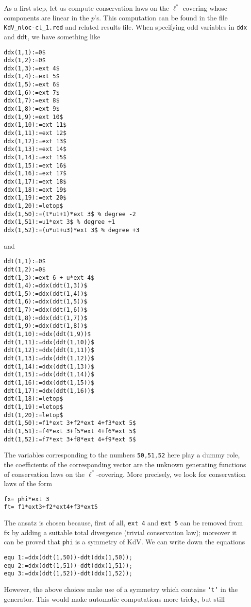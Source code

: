 \documentclass[12pt]{amsart}
\theoremstyle{definition}
\begin{document}
As a first step, let us compute conservation laws on the $\ell^*$-covering
whose components are linear in the $p$'s.  This computation can be found in the
file \texttt{KdV\_nloc-cl\_1.red} and related results file. When specifying odd
variables in \texttt{ddx} and \texttt{ddt}, we have something like
\begin{verbatim}
ddx(1,1):=0$
ddx(1,2):=0$
ddx(1,3):=ext 4$
ddx(1,4):=ext 5$
ddx(1,5):=ext 6$
ddx(1,6):=ext 7$
ddx(1,7):=ext 8$
ddx(1,8):=ext 9$
ddx(1,9):=ext 10$
ddx(1,10):=ext 11$
ddx(1,11):=ext 12$
ddx(1,12):=ext 13$
ddx(1,13):=ext 14$
ddx(1,14):=ext 15$
ddx(1,15):=ext 16$
ddx(1,16):=ext 17$
ddx(1,17):=ext 18$
ddx(1,18):=ext 19$
ddx(1,19):=ext 20$
ddx(1,20):=letop$
ddx(1,50):=(t*u1+1)*ext 3$ % degree -2
ddx(1,51):=u1*ext 3$ % degree +1
ddx(1,52):=(u*u1+u3)*ext 3$ % degree +3
\end{verbatim}
and
\begin{verbatim}
ddt(1,1):=0$
ddt(1,2):=0$
ddt(1,3):=ext 6 + u*ext 4$
ddt(1,4):=ddx(ddt(1,3))$
ddt(1,5):=ddx(ddt(1,4))$
ddt(1,6):=ddx(ddt(1,5))$
ddt(1,7):=ddx(ddt(1,6))$
ddt(1,8):=ddx(ddt(1,7))$
ddt(1,9):=ddx(ddt(1,8))$
ddt(1,10):=ddx(ddt(1,9))$
ddt(1,11):=ddx(ddt(1,10))$
ddt(1,12):=ddx(ddt(1,11))$
ddt(1,13):=ddx(ddt(1,12))$
ddt(1,14):=ddx(ddt(1,13))$
ddt(1,15):=ddx(ddt(1,14))$
ddt(1,16):=ddx(ddt(1,15))$
ddt(1,17):=ddx(ddt(1,16))$
ddt(1,18):=letop$
ddt(1,19):=letop$
ddt(1,20):=letop$
ddt(1,50):=f1*ext 3+f2*ext 4+f3*ext 5$
ddt(1,51):=f4*ext 3+f5*ext 4+f6*ext 5$
ddt(1,52):=f7*ext 3+f8*ext 4+f9*ext 5$
\end{verbatim}
The variables corresponding to the numbers \texttt{50,51,52} here play a dummy
role, the coefficients of the corresponding vector are the unknown generating
functions of conservation laws on the $\ell^*$-covering.
More precisely, we look for conservation laws
of the form
\begin{verbatim}
fx= phi*ext 3
ft= f1*ext3+f2*ext4+f3*ext5
\end{verbatim}
The ansatz is chosen because, first of all, \texttt{ext 4} and \texttt{ext 5}
can be removed from fx by adding a suitable total divergence (trivial
conservation law); moreover it can be proved that \texttt{phi} is a symmetry of
KdV. We can write down the equations
\begin{verbatim}
equ 1:=ddx(ddt(1,50))-ddt(ddx(1,50));
equ 2:=ddx(ddt(1,51))-ddt(ddx(1,51));
equ 3:=ddx(ddt(1,52))-ddt(ddx(1,52));
\end{verbatim}
However, the above choices make use of a symmetry which contains \texttt{`t'}
in the generator. This would make automatic computations more tricky, but still
\end{document}
